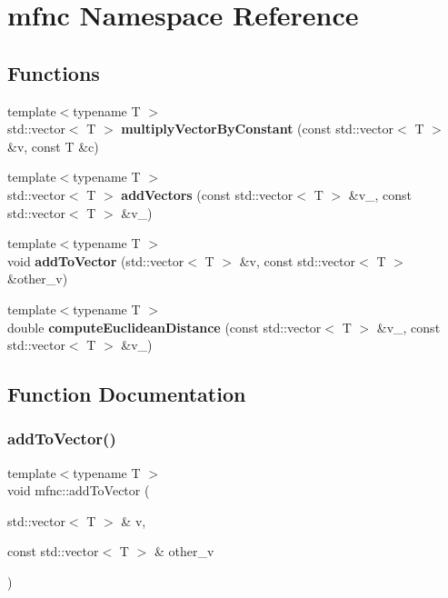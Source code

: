 \section{mfnc Namespace Reference}
\label{namespacemfnc}
\subsection*{Functions}
\begin{DoxyCompactItemize}
\item 
{\footnotesize template$<$typename T $>$ }\\std\+::vector$<$ T $>$ \textbf{ multiply\+Vector\+By\+Constant} (const std\+::vector$<$ T $>$ \&v, const T \&c)
\item 
{\footnotesize template$<$typename T $>$ }\\std\+::vector$<$ T $>$ \textbf{ add\+Vectors} (const std\+::vector$<$ T $>$ \&v\+\_, const std\+::vector$<$ T $>$ \&v\+\_)
\item 
{\footnotesize template$<$typename T $>$ }\\void \textbf{ add\+To\+Vector} (std\+::vector$<$ T $>$ \&v, const std\+::vector$<$ T $>$ \&other\+\_\+v)
\item 
{\footnotesize template$<$typename T $>$ }\\double \textbf{ compute\+Euclidean\+Distance} (const std\+::vector$<$ T $>$ \&v\+\_, const std\+::vector$<$ T $>$ \&v\+\_)
\end{DoxyCompactItemize}


\subsection{Function Documentation}
\mbox{\label{namespacemfnc_ab1abcc226326a393ab1e4c3b1f88993e}} 
\subsubsection{add\+To\+Vector()}
{\footnotesize\ttfamily template$<$typename T $>$ \\
void mfnc\+::add\+To\+Vector (\begin{DoxyParamCaption}\item[{std\+::vector$<$ T $>$ \&}]{v,  }\item[{const std\+::vector$<$ T $>$ \&}]{other\+\_\+v }\end{DoxyParamCaption})}



